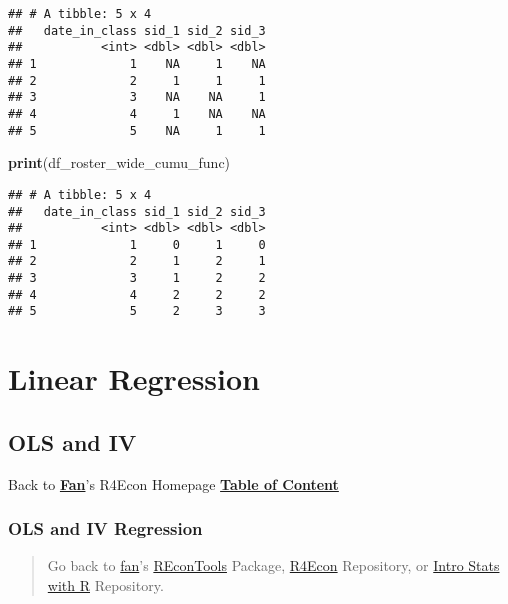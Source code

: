 \documentclass[
]{book}
\newenvironment{Shaded}{\begin{snugshade}}{\end{snugshade}}
\newcommand{\KeywordTok}[1]{\textcolor[rgb]{0.13,0.29,0.53}{\textbf{#1}}}
\newcommand{\NormalTok}[1]{#1}
\begin{document}
\begin{verbatim}
## # A tibble: 5 x 4
##   date_in_class sid_1 sid_2 sid_3
##           <int> <dbl> <dbl> <dbl>
## 1             1    NA     1    NA
## 2             2     1     1     1
## 3             3    NA    NA     1
## 4             4     1    NA    NA
## 5             5    NA     1     1
\end{verbatim}

\begin{Shaded}
\begin{Highlighting}[]
\KeywordTok{print}\NormalTok{(df_roster_wide_cumu_func)}
\end{Highlighting}
\end{Shaded}

\begin{verbatim}
## # A tibble: 5 x 4
##   date_in_class sid_1 sid_2 sid_3
##           <int> <dbl> <dbl> <dbl>
## 1             1     0     1     0
## 2             2     1     2     1
## 3             3     1     2     2
## 4             4     2     2     2
## 5             5     2     3     3
\end{verbatim}

\hypertarget{linear-regression}{%
\chapter{Linear Regression}\label{linear-regression}}

\hypertarget{ols-and-iv}{%
\section{OLS and IV}\label{ols-and-iv}}

Back to \textbf{\href{https://fanwangecon.github.io/}{Fan}}'s R4Econ Homepage \textbf{\href{https://fanwangecon.github.io/R4Econ/}{Table of Content}}

\hypertarget{ols-and-iv-regression}{%
\subsection{OLS and IV Regression}\label{ols-and-iv-regression}}

\begin{quote}
Go back to \href{http://fanwangecon.github.io/CodeDynaAsset/}{fan}'s \href{https://fanwangecon.github.io/REconTools/}{REconTools} Package, \href{https://fanwangecon.github.io/R4Econ/}{R4Econ} Repository, or \href{https://fanwangecon.github.io/Stat4Econ/}{Intro Stats with R} Repository.
\end{quote}
\end{document}
